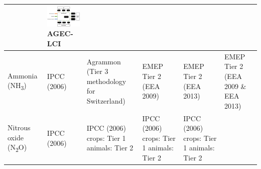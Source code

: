 \documentclass[openany]{book}
\begin{document}
\begin{longtable}[]{@{}llllll@{}}
\begin{minipage}[b]{0.12\columnwidth}
\end{minipage} & \begin{minipage}[b]{0.17\columnwidth}\raggedright
\includegraphics{Figures/agec_lci_logo.png} AGEC-LCI\strut
\end{minipage}\tabularnewline
\midrule
\endhead
\begin{minipage}[t]{0.12\columnwidth}\raggedright
Ammonia (NH\textsubscript{3})\strut
\end{minipage} & \begin{minipage}[t]{0.16\columnwidth}\raggedright
IPCC (2006)\strut
\end{minipage} & \begin{minipage}[t]{0.12\columnwidth}\raggedright
Agrammon (Tier 3 methodology for Switzerland)\strut
\end{minipage} & \begin{minipage}[t]{0.13\columnwidth}\raggedright
EMEP Tier 2 (EEA 2009)\strut
\end{minipage} & \begin{minipage}[t]{0.12\columnwidth}\raggedright
EMEP Tier 2 (EEA 2013)\strut
\end{minipage} & \begin{minipage}[t]{0.17\columnwidth}\raggedright
EMEP Tier 2 (EEA 2009 \& EEA 2013)\strut
\end{minipage}\tabularnewline
\begin{minipage}[t]{0.12\columnwidth}\raggedright
Nitrous oxide (N\textsubscript{2}O)\strut
\end{minipage} & \begin{minipage}[t]{0.16\columnwidth}\raggedright
IPCC (2006)\strut
\end{minipage} & \begin{minipage}[t]{0.12\columnwidth}\raggedright
IPCC (2006) crops: Tier 1 animals: Tier 2\strut
\end{minipage} & \begin{minipage}[t]{0.13\columnwidth}\raggedright
IPCC (2006) crops: Tier 1 animals: Tier 2\strut
\end{minipage} & \begin{minipage}[t]{0.12\columnwidth}\raggedright
IPCC (2006) crops: Tier 1 animals: Tier 2\strut
\end{minipage} & \begin{minipage}[t]{0.17\columnwidth}\raggedright

\end{minipage}
\end{longtable}
\end{document}
